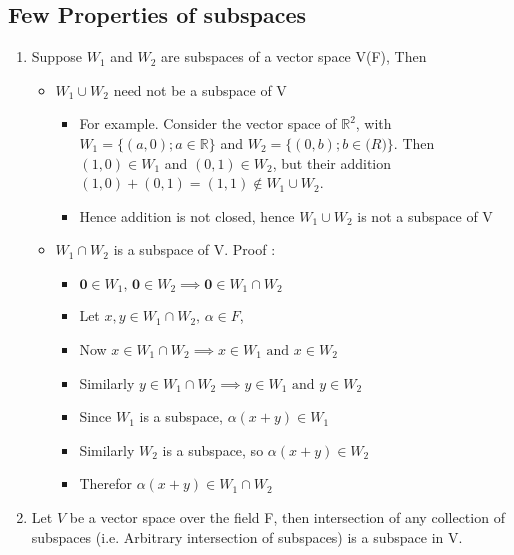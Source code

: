 \documentclass[twoside]{article}
\begin{document}
	\subsection{Few Properties of subspaces}
	\begin{enumerate}
		\item Suppose $W_1$ and $W_2$ are subspaces of a vector space V(F), Then
		\begin{itemize}
			\item $W_1 \cup W_2$ need not be a subspace of V
				\begin{itemize}
					\item For example. Consider the vector space of $\mathbb{R}^{2}$, with $W_1 = \{(a,0); a \in \mathbb{R}\}$ and $W_2 = \{(0,b); b\in \mathbb(R)\}$. Then $(1,0) \in W_1$ and $(0,1) \in W_2$, but their addition $(1,0) + (0,1) = (1,1) \notin W_1 \cup W_2$.
					\item Hence addition is not closed, hence $W_1 \cup W_2$ is not a subspace of V
				\end{itemize}
			\item $W_1 \cap W_2$ is a subspace of V. Proof :  
				\begin{itemize}
					\item $\mathbf{0} \in W_1 \text{, } \mathbf{0} \in W_2 \implies \mathbf{0} \in W_1 \cap W_2$
					\item Let $x, y \in W_1 \cap W_2 \text{, } \alpha \in F$,
					\item Now $x \in W_1 \cap W_2 \implies x \in W_1 \text{ and } x \in W_2$ 
					\item Similarly $y \in W_1 \cap W_2 \implies y \in W_1 \text{ and } y \in W_2$ 
					\item Since $W_1$ is a subspace, $\alpha (x + y) \in W_1$
					\item Similarly $W_2$ is a subspace, so $\alpha (x + y) \in W_2$
					\item Therefor $\alpha (x + y) \in W_1 \cap W_2$
				\end{itemize}
		\end{itemize}
		\item Let $V$ be a vector space over the field F, then intersection of any collection of subspaces (i.e. Arbitrary intersection of subspaces) is a subspace in V. 
	\end{enumerate}
\end{document}
